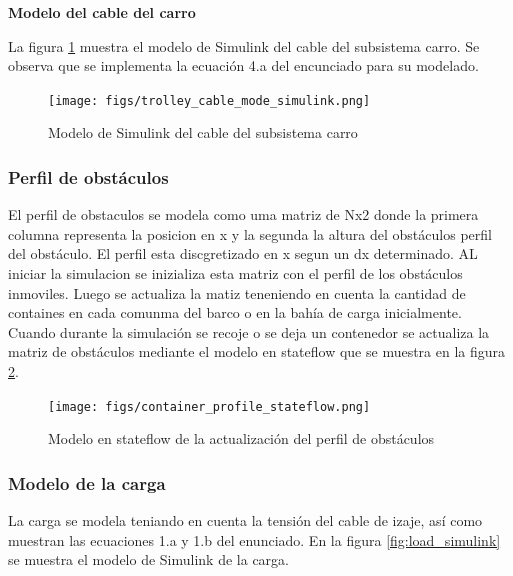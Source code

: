 \documentclass{article}
\begin{document}
            \textbf{Modelo del cable del carro}

            La figura \ref{fig:trolley_cable_mode_simulink} muestra el modelo de Simulink del cable del subsistema carro. Se observa que se implementa la ecuación 4.a del encunciado para su modelado.
            
            \begin{figure} [H]
                \centering
                \texttt{[image: figs/trolley\_cable\_mode\_simulink.png]}
                \caption{Modelo de Simulink del cable del subsistema carro}
                \label{fig:trolley_cable_mode_simulink}
            \end{figure}



            


        \subsubsection{Perfil de obstáculos}
        El perfil de obstaculos se modela como uma matriz de Nx2 donde la primera columna representa la posicion en x y la segunda la altura del obstáculos perfil del obstáculo. El perfil esta discgretizado en x segun un dx determinado. 
        AL iniciar la simulacion se inizializa esta matriz con el perfil de los obstáculos inmoviles. Luego se actualiza la matiz teneniendo en cuenta la cantidad de containes en cada comunma del barco o en la bahía de carga inicialmente.
        Cuando durante la simulación se recoje o se deja un contenedor se actualiza la matriz de obstáculos mediante el modelo en stateflow que se muestra en la figura \ref{fig:container_profile_stateflow}.
        \begin{figure} [H]
            \centering
            \texttt{[image: figs/container\_profile\_stateflow.png]}
            \caption{Modelo en stateflow de la actualización del perfil de obstáculos}
            \label{fig:container_profile_stateflow}
        \end{figure}

        \subsubsection{Modelo de la carga}
            
            La carga se modela teniando en cuenta la tensión del cable de izaje, así como muestran las ecuaciones 1.a y 1.b del enunciado. En la figura \ref{fig:load_simulink} se muestra el modelo de Simulink de la carga.
\end{document}

